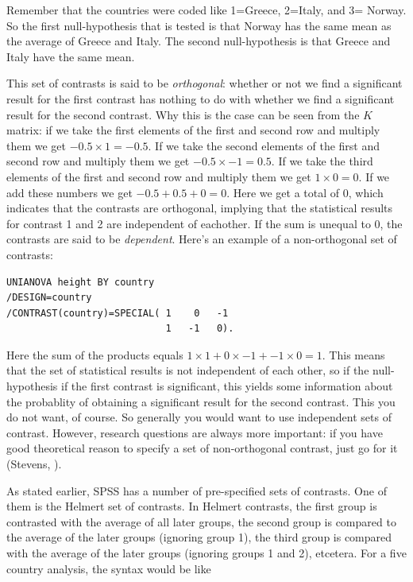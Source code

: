 \documentclass[]{report}\usepackage[]{graphicx}\usepackage[]{color}
\begin{document}
Remember that the countries were coded like 1=Greece, 2=Italy, and 3= Norway. So the first null-hypothesis that is tested is that Norway has the same mean as the average of Greece and Italy. The second null-hypothesis is that Greece and Italy have the same mean.

This set of contrasts is said to be \textit{orthogonal}: whether or not we find a significant result for the first contrast has nothing to do with whether we find a significant result for the second contrast. Why this is the case can be seen from the $K$ matrix: if we take the first elements of the first and second row and multiply them we get $-0.5 \times 1 = -0.5$. If we take the second elements of the first and second row and multiply them we get $-0.5 \times -1 = 0.5$. If we take the third elements of the first and second row and multiply them we get $1 \times 0 = 0$. If we add these numbers we get $-0.5 + 0.5 +0= 0 $. Here we get a total of 0, which indicates that the contrasts are orthogonal, implying that the statistical results for contrast 1 and 2 are independent of eachother. If the sum is unequal to 0, the contrasts are said to be \textit{dependent}. 
Here's an example of a non-orthogonal set of contrasts:

\begin{verbatim}
UNIANOVA height BY country
/DESIGN=country
/CONTRAST(country)=SPECIAL( 1    0   -1
                            1   -1   0).
\end{verbatim}

Here the sum of the products equals $1\times 1 +0\times -1 + -1 \times 0 =1$. This means that the set of statistical results is not independent of each other, so if the null-hypothesis if the first contrast is significant, this yields some information about the probablity of obtaining a significant result for the second contrast. This you do not want, of course. So generally you would want to use independent sets of contrast. However, research questions are always more important: if you have good theoretical reason to specify a set of non-orthogonal contrast, just go for it (Stevens, ).

As stated earlier, SPSS has a number of pre-specified sets of contrasts. One of them is the Helmert set of contrasts. In Helmert contrasts, the first group is contrasted with the average of all later groups, the second group is compared to the average of the later groups (ignoring group 1), the third group is compared with the average of the later groups (ignoring groups 1 and 2), etcetera. For a five country analysis, the syntax would be like
\end{document}
